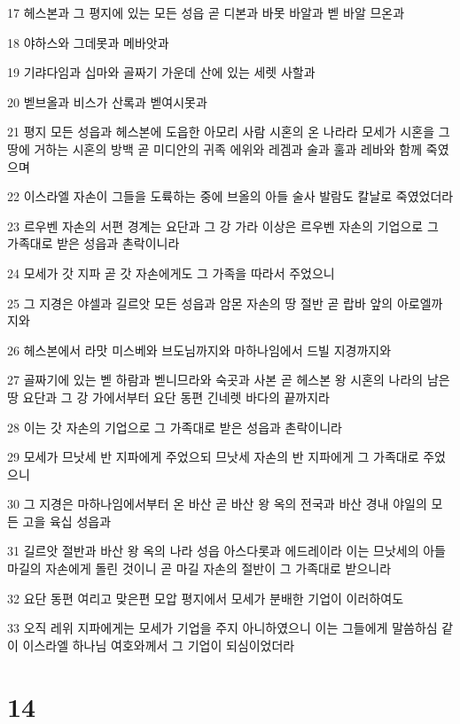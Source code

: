 \par 17 헤스본과 그 평지에 있는 모든 성읍 곧 디본과 바못 바알과 벧 바알 므온과
\par 18 야하스와 그데못과 메바앗과
\par 19 기랴다임과 십마와 골짜기 가운데 산에 있는 세렛 사할과
\par 20 벧브올과 비스가 산록과 벧여시못과
\par 21 평지 모든 성읍과 헤스본에 도읍한 아모리 사람 시혼의 온 나라라 모세가 시혼을 그 땅에 거하는 시혼의 방백 곧 미디안의 귀족 에위와 레겜과 술과 훌과 레바와 함께 죽였으며
\par 22 이스라엘 자손이 그들을 도륙하는 중에 브올의 아들 술사 발람도 칼날로 죽였었더라
\par 23 르우벤 자손의 서편 경계는 요단과 그 강 가라 이상은 르우벤 자손의 기업으로 그 가족대로 받은 성읍과 촌락이니라
\par 24 모세가 갓 지파 곧 갓 자손에게도 그 가족을 따라서 주었으니
\par 25 그 지경은 야셀과 길르앗 모든 성읍과 암몬 자손의 땅 절반 곧 랍바 앞의 아로엘까지와
\par 26 헤스본에서 라맛 미스베와 브도님까지와 마하나임에서 드빌 지경까지와
\par 27 골짜기에 있는 벧 하람과 벧니므라와 숙곳과 사본 곧 헤스본 왕 시혼의 나라의 남은 땅 요단과 그 강 가에서부터 요단 동편 긴네렛 바다의 끝까지라
\par 28 이는 갓 자손의 기업으로 그 가족대로 받은 성읍과 촌락이니라
\par 29 모세가 므낫세 반 지파에게 주었으되 므낫세 자손의 반 지파에게 그 가족대로 주었으니
\par 30 그 지경은 마하나임에서부터 온 바산 곧 바산 왕 옥의 전국과 바산 경내 야일의 모든 고을 육십 성읍과
\par 31 길르앗 절반과 바산 왕 옥의 나라 성읍 아스다롯과 에드레이라 이는 므낫세의 아들 마길의 자손에게 돌린 것이니 곧 마길 자손의 절반이 그 가족대로 받으니라
\par 32 요단 동편 여리고 맞은편 모압 평지에서 모세가 분배한 기업이 이러하여도
\par 33 오직 레위 지파에게는 모세가 기업을 주지 아니하였으니 이는 그들에게 말씀하심 같이 이스라엘 하나님 여호와께서 그 기업이 되심이었더라

\chapter{14}

